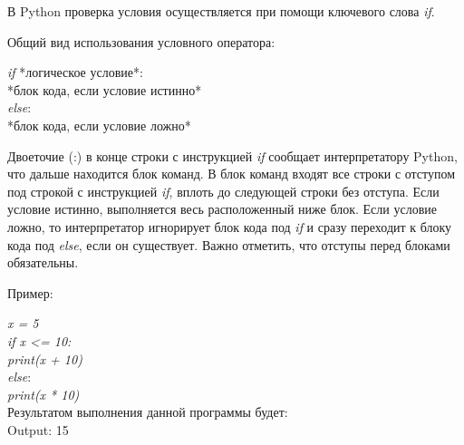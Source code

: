 В Python проверка условия осуществляется при помощи ключевого слова \colorbox[rgb]{0.95, 0.95, 0.95}{\textit{if}}.

Общий вид использования условного оператора:

\begin{flushleft}
	\colorbox[rgb]{0.95, 0.95, 0.95}{\textit{if} *логическое условие*:} \\
	\colorbox[rgb]{0.95, 0.95, 0.95}{\hspace{1cm} *блок кода, если условие истинно*} \\
	\colorbox[rgb]{0.95, 0.95, 0.95}{\textit{else}:} \\
	\colorbox[rgb]{0.95, 0.95, 0.95}{\hspace{1cm} *блок кода, если условие ложно*} \\
\end{flushleft}

Двоеточие (:) в конце строки с инструкцией \colorbox[rgb]{0.95, 0.95, 0.95}{\textit{if}} сообщает интерпретатору Python, что дальше находится блок команд. В блок команд входят все строки с отступом под строкой с инструкцией \colorbox[rgb]{0.95, 0.95, 0.95}{\textit{if}}, вплоть до следующей строки без отступа. Если условие истинно, выполняется весь расположенный ниже блок. Если условие ложно, то интерпретатор игнорирует блок кода под \colorbox[rgb]{0.95, 0.95, 0.95}{\textit{if}} и сразу переходит к блоку кода под \colorbox[rgb]{0.95, 0.95, 0.95}{\textit{else}}, если он существует. Важно отметить, что отступы перед блоками обязательны.

Пример:

\begin{flushleft}
	\colorbox[rgb]{0.95, 0.95, 0.95}{\textit{x = 5}} \\
	\colorbox[rgb]{0.95, 0.95, 0.95}{\textit{if x <= 10:}} \\
	\colorbox[rgb]{0.95, 0.95, 0.95}{\hspace{1cm} \textit{print(x + 10)}} \\
	\colorbox[rgb]{0.95, 0.95, 0.95}{\textit{else}:} \\
	\colorbox[rgb]{0.95, 0.95, 0.95}{\hspace{1cm} \textit{print(x * 10)}} \\
	Результатом выполнения данной программы будет: \\
	\colorbox[rgb]{0.95, 0.95, 0.95}{Output: 15} \\
\end{flushleft}


